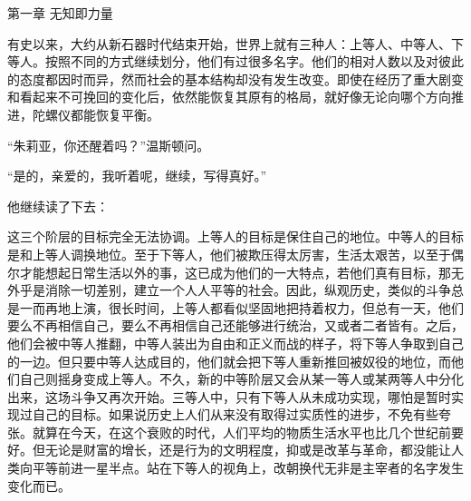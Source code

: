 第一章 无知即力量

有史以来，大约从新石器时代结束开始，世界上就有三种人：上等人、中等人、下等人。按照不同的方式继续划分，他们有过很多名字。他们的相对人数以及对彼此的态度都因时而异，然而社会的基本结构却没有发生改变。即使在经历了重大剧变和看起来不可挽回的变化后，依然能恢复其原有的格局，就好像无论向哪个方向推进，陀螺仪都能恢复平衡。

``朱莉亚，你还醒着吗？''温斯顿问。

``是的，亲爱的，我听着呢，继续，写得真好。''

他继续读了下去：

这三个阶层的目标完全无法协调。上等人的目标是保住自己的地位。中等人的目标是和上等人调换地位。至于下等人，他们被欺压得太厉害，生活太艰苦，以至于偶尔才能想起日常生活以外的事，这已成为他们的一大特点，若他们真有目标，那无外乎是消除一切差别，建立一个人人平等的社会。因此，纵观历史，类似的斗争总是一而再地上演，很长时间，上等人都看似坚固地把持着权力，但总有一天，他们要么不再相信自己，要么不再相信自己还能够进行统治，又或者二者皆有。之后，他们会被中等人推翻，中等人装出为自由和正义而战的样子，将下等人争取到自己的一边。但只要中等人达成目的，他们就会把下等人重新推回被奴役的地位，而他们自己则摇身变成上等人。不久，新的中等阶层又会从某一等人或某两等人中分化出来，这场斗争又再次开始。三等人中，只有下等人从未成功实现，哪怕是暂时实现过自己的目标。如果说历史上人们从来没有取得过实质性的进步，不免有些夸张。就算在今天，在这个衰败的时代，人们平均的物质生活水平也比几个世纪前要好。但无论是财富的增长，还是行为的文明程度，抑或是改革与革命，都没能让人类向平等前进一星半点。站在下等人的视角上，改朝换代无非是主宰者的名字发生变化而已。

